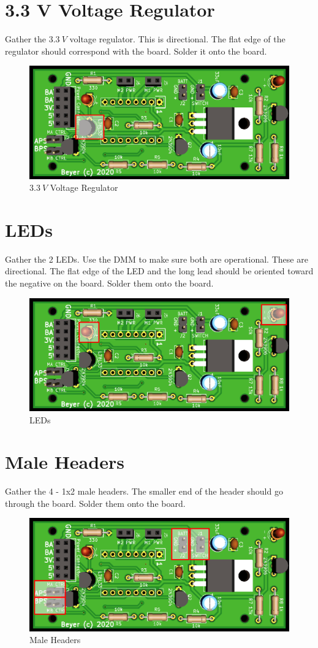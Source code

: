 \documentclass{handout}
\begin{document}
\newpage
\clearpage
\pagebreak

	\section{3.3 V Voltage Regulator}
	Gather the $3.3\ V$ voltage regulator. This is directional. The flat edge of the regulator should correspond with the board. Solder it onto the board.
	
	\begin{figure} [H]
		\centering
		\includegraphics[width=.5\textwidth]{33vreg.png}
		\caption{$3.3\ V$ Voltage Regulator}
	\end{figure}
	
	\section{LEDs}
	Gather the 2 LEDs. Use the DMM to make sure both are operational. These are directional. The flat edge of the LED and the long lead should be oriented toward the negative on the board. Solder them onto the board.
	
	\begin{figure} [H]
		\centering
		\includegraphics[width=.5\textwidth]{leds.png}
		\caption{LEDs}
	\end{figure}
	
	\section{Male Headers}
	Gather the 4 - 1x2 male headers. The smaller end of the header should go through the board. Solder them onto the board.
	
	\begin{figure} [H]
		\centering
		\includegraphics[width=.5\textwidth]{maleheaders.png}
		\caption{Male Headers}
	\end{figure}
\end{document}
